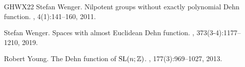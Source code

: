 \documentclass[a4paper,leqno]{amsart}
\numberwithin{equation}{section}
\theoremstyle{remark}
\theoremstyle{remark}
\begin{document}
\begin{thebibliography}{GHWX22}
Stefan Wenger.
\newblock Nilpotent groups without exactly polynomial {D}ehn function.
, 4(1):141--160, 2011.

Stefan Wenger.
\newblock Spaces with almost {E}uclidean {D}ehn function.
, 373(3-4):1177--1210, 2019.

Robert Young.
\newblock The {D}ehn function of {${\rm SL}(n;\Bbb Z)$}.
, 177(3):969--1027, 2013.

\end{thebibliography}
\end{document}
